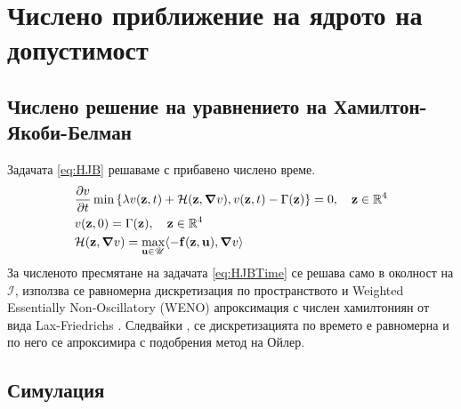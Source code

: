 \section{Числено приближение на ядрото на допустимост}
\subsection{Числено решение на уравнението на Хамилтон-Якоби-Белман}
Задачата \eqref{eq:HJB} решаваме с прибавено числено време.
\begin{equation}
  \label{eq:HJBTime}
  \begin{split}
    &\pdv{v}{t}(\mathbf{z}, t) \min\left\{\lambda v(\mathbf{z}, t) + \mathcal{H}(\mathbf{z}, \grad{v}), v(\mathbf{z}, t) - \Gamma(\mathbf{z})\right\} = 0, \quad \mathbf{z} \in \mathbb{R}^4 \\
    &v(\mathbf{z}, 0) = \Gamma(\mathbf{z}), \quad \mathbf{z} \in \mathbb{R}^4 \\
    &\mathcal{H}(\mathbf{z}, \grad{v}) = \max_{\mathbf{u} \in \mathscr{U}} \langle -\mathbf{f}(\mathbf{z}, \mathbf{u}), \grad{v} \rangle
  \end{split}
\end{equation}
За численото пресмятане на задачата \eqref{eq:HJBTime} се решава само в околност на $\mathscr{I}$, използва се равномерна дискретизация по пространството и Weighted Essentially Non-Oscillatory (WENO) \cite[3.4]{Osher2003} апроксимация с числен хамилтониян от вида Lax-Friedrichs \cite[5.3]{Osher2003}
. Следвайки \cite[3.5]{Osher2003}, се дискретизацията по времето е равномерна и по него се апроксимира с подобрения метод на Ойлер.

\subsection{Симулация}

